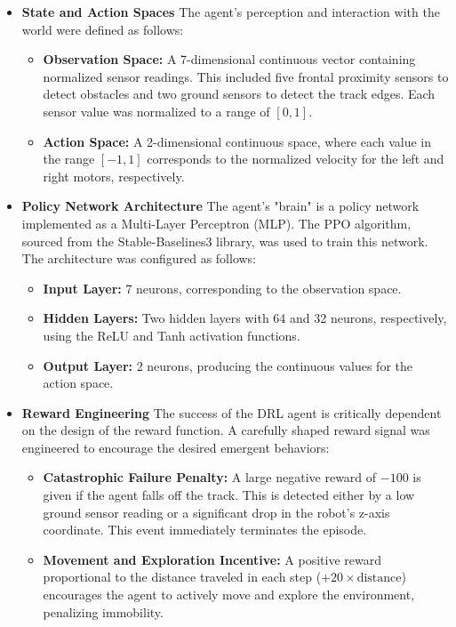 \documentclass[final,5p,times,twocolumn,authoryear]{elsarticle}
\begin{document}
\begin{itemize}
    \item \textbf{State and Action Spaces}
        The agent's perception and interaction with the world were defined as follows:
        \begin{itemize}
            \item \textbf{Observation Space:} A 7-dimensional continuous vector containing normalized sensor readings. This included five frontal proximity sensors to detect obstacles and two ground sensors to detect the track edges. Each sensor value was normalized to a range of \([0, 1]\).
            \item \textbf{Action Space:} A 2-dimensional continuous space, where each value in the range \([-1, 1]\) corresponds to the normalized velocity for the left and right motors, respectively.
        \end{itemize}
    \item \textbf{Policy Network Architecture}
        The agent's "brain" is a policy network implemented as a Multi-Layer Perceptron (MLP). The PPO algorithm, sourced from the Stable-Baselines3 library, was used to train this network. The architecture was configured as follows:
        \begin{itemize}
            \item \textbf{Input Layer:} 7 neurons, corresponding to the observation space.
            \item \textbf{Hidden Layers:} Two hidden layers with 64 and 32 neurons, respectively, using the ReLU and Tanh activation functions.
            \item \textbf{Output Layer:} 2 neurons, producing the continuous values for the action space.
        \end{itemize}
    \item \textbf{Reward Engineering}
        The success of the DRL agent is critically dependent on the design of the reward function. A carefully shaped reward signal was engineered to encourage the desired emergent behaviors:
        \begin{itemize}
            \item \textbf{Catastrophic Failure Penalty:} A large negative reward of \(-100\) is given if the agent falls off the track. This is detected either by a low ground sensor reading or a significant drop in the robot's z-axis coordinate. This event immediately terminates the episode.
            \item \textbf{Movement and Exploration Incentive:} A positive reward proportional to the distance traveled in each step ($+20 \times \text{distance}$) encourages the agent to actively move and explore the environment, penalizing immobility.

\end{itemize}
\end{itemize}
\end{document}
